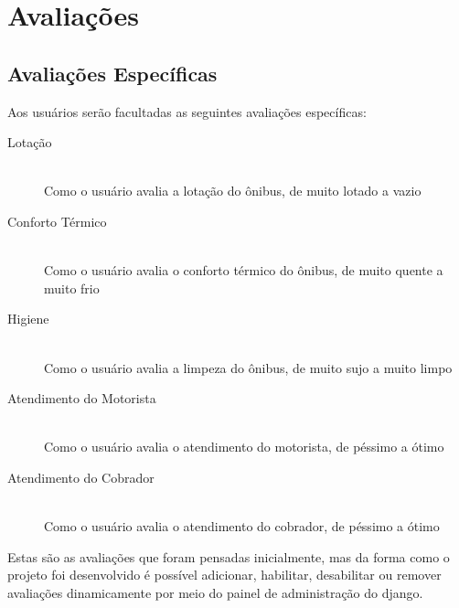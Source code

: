 \section{Avaliações}\label{sec:avalia}
\subsection{Avaliações Específicas}\label{subsec:avaliaspec}
Aos usuários serão facultadas as seguintes avaliações específicas:
\begin{description}
    \item[Lotação] \hfill \\
    Como o usuário avalia a lotação do ônibus, de muito lotado a vazio
    \item[Conforto Térmico] \hfill \\
    Como o usuário avalia o conforto térmico do ônibus, de muito quente a muito frio
    \item[Higiene] \hfill \\
    Como o usuário avalia a limpeza do ônibus, de muito sujo a muito limpo
    \item[Atendimento do Motorista] \hfill \\
    Como o usuário avalia o atendimento do motorista, de péssimo a ótimo
    \item[Atendimento do Cobrador] \hfill \\
    Como o usuário avalia o atendimento do cobrador, de péssimo a ótimo    
\end{description}

Estas são as avaliações que foram pensadas inicialmente, mas da forma como o projeto foi desenvolvido é possível adicionar, habilitar, desabilitar ou remover avaliações dinamicamente por meio do painel de administração do \gls{django}.